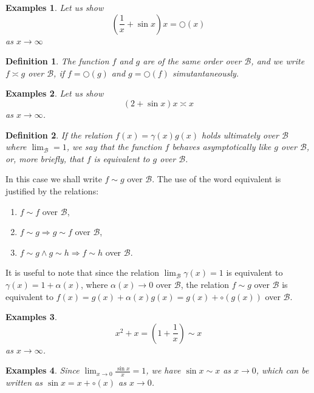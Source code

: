 \documentclass[a4paper,12pt]{article} %
\newtheorem{definition}{Definition}[section]
\newtheorem{example}{Examples}
\begin{document}
\begin{example}
    Let us show 
    \[
        \left(\frac{1}{x}+\sin x\right)x = \bigcirc(x)
        \]
    as $x \to \infty$
\end{example}

\begin{definition}
    The function $f$ and $g$ are of the same order over $\mathcal{B}$,
    and we write $f \asymp g$ over $\mathcal{B}$, if $f = \bigcirc(g)$
    and $g = \bigcirc(f)$ simutantaneously.
\end{definition}

\begin{example}
    Let us show 
    \[
    (2+\sin x)x \asymp x
    \]
as $x \to \infty$.
\end{example}

\begin{definition}
    If the relation $f(x) = \gamma(x)g(x)$ holds ultimately over $\mathcal{B}$
    where $\lim_{\mathcal{B}} = 1$, we say that the function $f$ behaves asymptotically 
    like $g$ over $\mathcal{B}$, or, more briefly, that $f$ is equivalent to $g$ over $\mathcal{B}$.
\end{definition}

In this case we shall write $f \sim g$ over $\mathcal{B}$.
The use of the word equivalent is justified by the relations:
\begin{enumerate}
    \item $f \sim f$ over $\mathcal{B}$,
    \item $f \sim g \Rightarrow g \sim f$ over $\mathcal{B}$,
    \item $f \sim g \wedge g \sim h \Rightarrow f \sim h$ over $\mathcal{B}$.
\end{enumerate}

It is useful to note that since the relation $\lim_{\mathcal{B}}\gamma(x) = 1$ is equivalent 
to $\gamma(x) = 1 + \alpha(x)$, where $\alpha(x) \to 0$ over $\mathcal{B}$, the relation 
$f \sim g$ over $\mathcal{B}$ is equivalent to $f(x) = g(x) + \alpha(x)g(x) = g(x) + \circ(g(x))$
over $\mathcal{B}$.

\begin{example}
    \[
        x^2+x = \left(1+\frac{1}{x}\right) \sim x
        \]
    as $x \to \infty$.
\end{example}

\begin{example}
    Since $\displaystyle \lim_{x \to 0}\frac{\sin x}{x} = 1$,
    we have $\sin x \sim x$ as $x \to 0$, which can be written as 
    $\sin x = x + \circ(x)$ as $x \to 0$.
\end{example}
\end{document}

